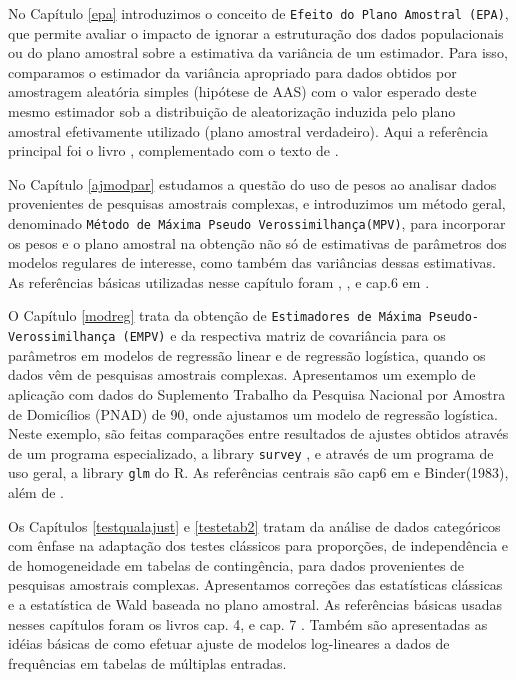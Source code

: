 \documentclass[]{book}
\numberwithin{example}{chapter}
\numberwithin{remark}{chapter}
\numberwithin{definition}{chapter}
\begin{document}
No Capítulo \ref{epa} introduzimos o conceito de
\texttt{Efeito\ do\ Plano\ Amostral\ (EPA)}, que permite avaliar o
impacto de ignorar a estruturação dos dados populacionais ou do plano
amostral sobre a estimativa da variância de um estimador. Para isso,
comparamos o estimador da variância apropriado para dados obtidos por
amostragem aleatória simples (hipótese de AAS) com o valor esperado
deste mesmo estimador sob a distribuição de aleatorização induzida pelo
plano amostral efetivamente utilizado (plano amostral verdadeiro). Aqui
a referência principal foi o livro \citep{SHS89}, complementado com o
texto de \citep{lethonen}.

No Capítulo \ref{ajmodpar} estudamos a questão do uso de pesos ao
analisar dados provenientes de pesquisas amostrais complexas, e
introduzimos um método geral, denominado
\texttt{Método\ de\ Máxima\ Pseudo\ Verossimilhança(MPV)}, para
incorporar os pesos e o plano amostral na obtenção não só de estimativas
de parâmetros dos modelos regulares de interesse, como também das
variâncias dessas estimativas. As referências básicas utilizadas nesse
capítulo foram \citep{SHS89}, \citep{Pfeff}, \citep{binder83} e cap.6 em
\citep{Silva}.

O Capítulo \ref{modreg} trata da obtenção de
\texttt{Estimadores\ de\ Máxima\ Pseudo-Verossimilhança\ (EMPV)} e da
respectiva matriz de covariância para os parâmetros em modelos de
regressão linear e de regressão logística, quando os dados vêm de
pesquisas amostrais complexas. Apresentamos um exemplo de aplicação com
dados do Suplemento Trabalho da Pesquisa Nacional por Amostra de
Domicílios (PNAD) de 90, onde ajustamos um modelo de regressão
logística. Neste exemplo, são feitas comparações entre resultados de
ajustes obtidos através de um programa especializado, a library
\texttt{survey} \citep{R-survey}, e através de um programa de uso geral,
a library \texttt{glm} do R. As referências centrais são cap6 em
\citep{Silva} e Binder(1983), além de \citep{Pessoa}.

Os Capítulos \ref{testqualajust} e \ref{testetab2} tratam da análise de
dados categóricos com ênfase na adaptação dos testes clássicos para
proporções, de independência e de homogeneidade em tabelas de
contingência, para dados provenientes de pesquisas amostrais complexas.
Apresentamos correções das estatísticas clássicas e a estatística de
Wald baseada no plano amostral. As referências básicas usadas nesses
capítulos foram os livros cap. 4, \citep{SHS89} e cap. 7
\citep{lethonen}. Também são apresentadas as idéias básicas de como
efetuar ajuste de modelos log-lineares a dados de frequências em tabelas
de múltiplas entradas.
\end{document}

